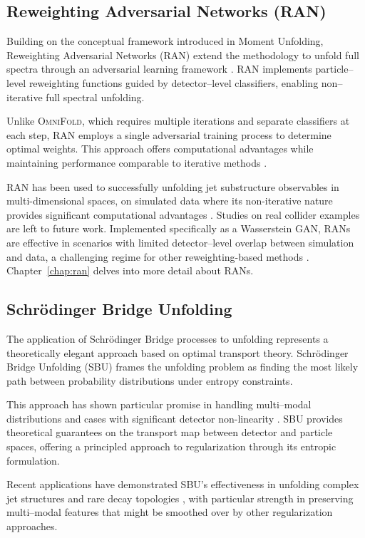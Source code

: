 \subsection{Reweighting Adversarial Networks (RAN)}

    Building on the conceptual framework introduced in Moment Unfolding, Reweighting Adversarial Networks (RAN) extend the methodology to unfold full spectra through an adversarial learning framework .
    RAN implements particle--level reweighting functions guided by detector--level classifiers, enabling non--iterative full spectral unfolding.

    Unlike \textsc{OmniFold}, which requires multiple iterations and separate classifiers at each step, RAN employs a single adversarial training process to determine optimal weights.
    This approach offers computational advantages while maintaining performance comparable to iterative methods .

    RAN has been used to successfully unfolding jet substructure observables in multi-dimensional spaces, on simulated data where its non-iterative nature provides significant computational advantages .
    Studies on real collider examples are left to future work.
    Implemented specifically as a Wasserstein GAN, RANs are effective in scenarios with limited detector--level overlap between simulation and data, a challenging regime for other reweighting-based methods .
    Chapter~\ref{chap:ran} delves into more detail about RANs.

\subsection{Schrödinger Bridge Unfolding}
    The application of Schrödinger Bridge processes to unfolding represents a theoretically elegant approach based on optimal transport theory.
    Schrödinger Bridge Unfolding (SBU)  frames the unfolding problem as finding the most likely path between probability distributions under entropy constraints.

    This approach has shown particular promise in handling multi--modal distributions and cases with significant detector non-linearity .
    SBU provides theoretical guarantees on the transport map between detector and particle spaces, offering a principled approach to regularization through its entropic formulation.

    Recent applications have demonstrated SBU's effectiveness in unfolding complex jet structures and rare decay topologies , with particular strength in preserving multi--modal features that might be smoothed over by other regularization approaches.
